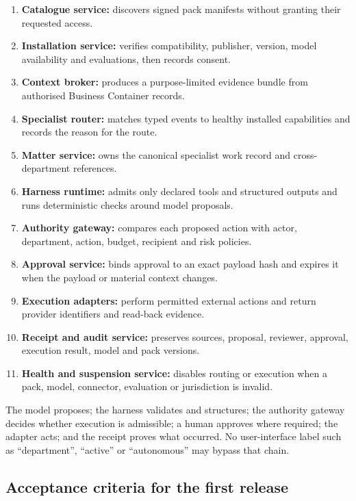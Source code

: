 \begin{enumerate}[leftmargin=*]
  \item \textbf{Catalogue service:} discovers signed pack manifests without
        granting their requested access.
  \item \textbf{Installation service:} verifies compatibility, publisher,
        version, model availability and evaluations, then records consent.
  \item \textbf{Context broker:} produces a purpose-limited evidence bundle from
        authorised Business Container records.
  \item \textbf{Specialist router:} matches typed events to healthy installed
        capabilities and records the reason for the route.
  \item \textbf{Matter service:} owns the canonical specialist work record and
        cross-department references.
  \item \textbf{Harness runtime:} admits only declared tools and structured
        outputs and runs deterministic checks around model proposals.
  \item \textbf{Authority gateway:} compares each proposed action with actor,
        department, action, budget, recipient and risk policies.
  \item \textbf{Approval service:} binds approval to an exact payload hash and
        expires it when the payload or material context changes.
  \item \textbf{Execution adapters:} perform permitted external actions and
        return provider identifiers and read-back evidence.
  \item \textbf{Receipt and audit service:} preserves sources, proposal,
        reviewer, approval, execution result, model and pack versions.
  \item \textbf{Health and suspension service:} disables routing or execution
        when a pack, model, connector, evaluation or jurisdiction is invalid.
\end{enumerate}

The model proposes; the harness validates and structures; the authority gateway
decides whether execution is admissible; a human approves where required; the
adapter acts; and the receipt proves what occurred.  No user-interface label
such as ``department'', ``active'' or ``autonomous'' may bypass that chain.

\subsection{Acceptance criteria for the first release}

